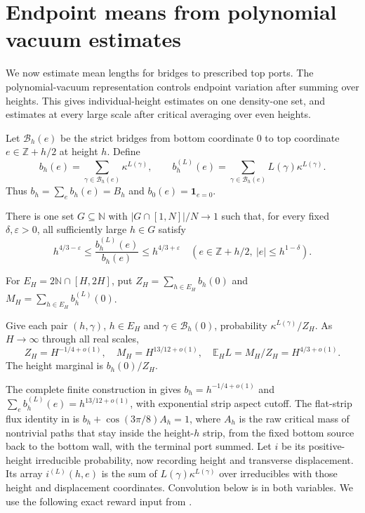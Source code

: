\section{Endpoint means from polynomial vacuum estimates}\label{c:pvmeans}
We now estimate mean lengths for bridges to prescribed top ports.
The polynomial-vacuum representation controls endpoint variation after
summing over heights. This gives individual-height estimates on one
density-one set, and estimates at every large scale after critical
averaging over even heights.

Let $\mathcal B_h(e)$ be the strict bridges from bottom coordinate $0$
to top coordinate $e\in\mathbb Z+h/2$ at height $h$. Define
\[
 b_h(e)=\sum_{\gamma\in\mathcal B_h(e)}\kappa^{L(\gamma)},\qquad
 b_h^{(L)}(e)=\sum_{\gamma\in\mathcal B_h(e)}L(\gamma)\kappa^{L(\gamma)}.
\]
Thus $b_h=\sum_e b_h(e)=B_h$ and $b_0(e)=\mathbf1_{e=0}$.
\begin{theorem}\label{c:density-one}
There is one set $G\subseteq\mathbb N$ with
$|G\cap[1,N]|/N\to1$ such that, for every fixed $\delta,\varepsilon>0$,
all sufficiently large $h\in G$ satisfy
\[
 h^{4/3-\varepsilon}\le\frac{b_h^{(L)}(e)}{b_h(e)}
       \le h^{4/3+\varepsilon}
 \quad(e\in\mathbb Z+h/2,\ |e|\le h^{1-\delta}).
\]
\end{theorem}
For $E_H=2\mathbb N\cap[H,2H]$, put
$Z_H=\sum_{h\in E_H}b_h(0)$ and
$M_H=\sum_{h\in E_H}b_h^{(L)}(0)$.
\begin{theorem}\label{c:mixture}
Give each pair $(h,\gamma)$, $h\in E_H$ and
$\gamma\in\mathcal B_h(0)$, probability $\kappa^{L(\gamma)}/Z_H$.
As $H\to\infty$ through all real scales,
\[
 Z_H=H^{-1/4+o(1)},\quad M_H=H^{13/12+o(1)},\quad
 \mathbb E_H L=M_H/Z_H=H^{4/3+o(1)}.
\]
The height marginal is $b_h(0)/Z_H$.
\end{theorem}

The complete finite construction in \cite[Theorem 1.1 and Lemma 8.2]{PolynomialVacuum} gives
$b_h=h^{-1/4+o(1)}$ and
$\sum_e b_h^{(L)}(e)=h^{13/12+o(1)}$, with exponential strip aspect
cutoff. The flat-strip flux identity in \cite[Section 2]{PolynomialVacuum}
is $b_h+\cos(3\pi/8)A_h=1$, where $A_h$ is the raw critical
mass of nontrivial paths that stay inside the height-$h$ strip,
from the fixed bottom source back to the bottom wall,
with the terminal port summed. Let $i$ be its positive-height irreducible
probability, now recording height and transverse displacement. Its array
$i^{(L)}(h,e)$ is the sum of $L(\gamma)\kappa^{L(\gamma)}$ over
irreducibles with those height and displacement coordinates. Convolution
below is in both variables. We use the following exact reward input from
\cite[Proposition 10.1]{Renewal}.

